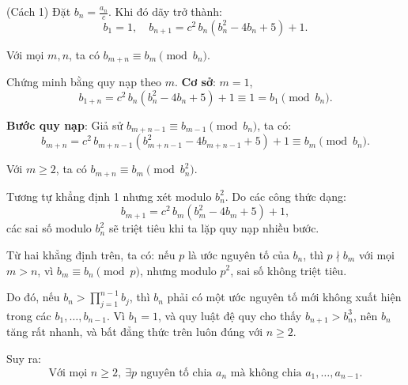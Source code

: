 \documentclass[../06-largest-exponent.tex]{subfiles}
\begin{document}
\begin{soln}(Cách 1)\footnotemark
    Đặt \( b_n = \frac{a_n}{c} \). Khi đó dãy trở thành:
    \[
        b_1 = 1,\quad b_{n+1} = c^2\,b_n(b_n^2 - 4b_n + 5) + 1.
    \]

    \begin{claim*}[1]
        Với mọi \(m, n\), ta có \(b_{m+n} \equiv b_m \pmod{b_n}\).
    \end{claim*}

    \begin{subproof}
        Chứng minh bằng quy nạp theo \( m \).  
        \textbf{Cơ sở}: \( m = 1 \),
        \[
            b_{1+n} = c^2\,b_n(b_n^2 - 4b_n + 5) + 1 \equiv 1 = b_1 \pmod{b_n}.
        \]

        \textbf{Bước quy nạp}: Giả sử \( b_{m+n-1} \equiv b_{m-1} \pmod{b_n} \), ta có:
        \[
            b_{m+n} = c^2\,b_{m+n-1}(b_{m+n-1}^2 - 4b_{m+n-1} + 5) + 1 \equiv b_m \pmod{b_n}.
        \]
    \end{subproof}

    \begin{claim*}[2]
        Với \( m \ge 2 \), ta có \( b_{m+n} \equiv b_m \pmod{b_n^2} \).
    \end{claim*}

    \begin{subproof}
        Tương tự khẳng định 1 nhưng xét modulo \( b_n^2 \). Do các công thức dạng:
        \[
            b_{m+1} = c^2\,b_m(b_m^2 - 4b_m + 5) + 1,
        \]
        các sai số modulo \( b_n^2 \) sẽ triệt tiêu khi ta lặp quy nạp nhiều bước.
    \end{subproof}

    Từ hai khẳng định trên, ta có: nếu \( p \) là ước nguyên tố của \( b_n \), thì \( p \nmid b_{m} \) với mọi \( m > n \), vì \( b_{m} \equiv b_n \pmod{p} \), nhưng modulo \( p^2 \), sai số không triệt tiêu.

    Do đó, nếu \( b_n > \prod_{j=1}^{n-1} b_j \), thì \( b_n \) phải có một ước nguyên tố mới không xuất hiện trong các \( b_1, \dots, b_{n-1} \).  
    Vì \( b_1 = 1 \), và quy luật đệ quy cho thấy \( b_{n+1} > b_n^3 \), nên \( b_n \) tăng rất nhanh, và bất đẳng thức trên luôn đúng với \( n \ge 2 \).

    Suy ra:
    \[
        \boxed{\text{Với mọi } n \ge 2,\ \exists p \text{ nguyên tố chia } a_n \text{ mà không chia } a_1,\dots,a_{n-1}.}
    \]
\end{soln}

\end{document}
